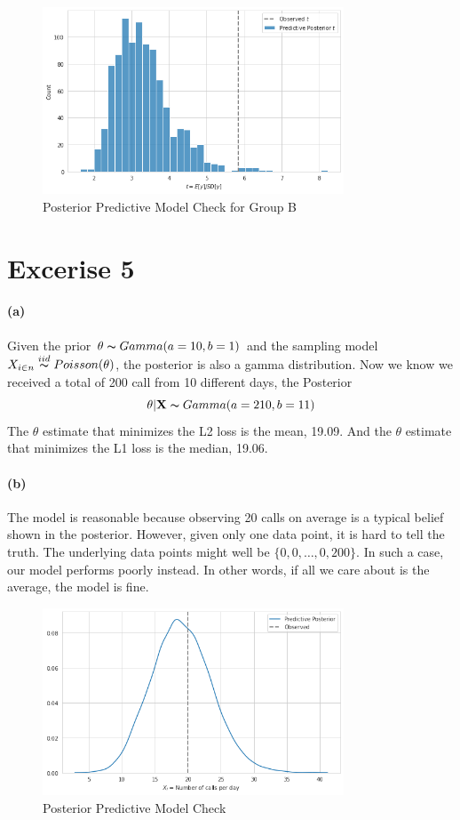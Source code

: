 \documentclass[11pt, letterpaper]{article}
\begin{document}
\begin{figure}[!h]
  \centering
  \includegraphics[width=0.8\textwidth]{4.3.b.png}
  \captionsetup{justification=centering}
  \caption{Posterior Predictive Model Check for Group B}
\end{figure}
\newpage


\section{Excerise 5}
\paragraph{(a)}
Given the prior $\theta \thicksim Gamma(a=10, b=1)$ and the sampling model
$X_{i \in n} \overset{iid}{\thicksim} Poisson(\theta)$, the posterior is also a gamma distribution.
Now we know we received a total of 200 call from 10 different days, the Posterior
\[ \theta|\mathbf{X} \thicksim Gamma(a=210, b=11) \]
The $\theta$ estimate that minimizes the L2 loss is the mean, 19.09. And the $\theta$ estimate
that minimizes the L1 loss is the median, 19.06.

\paragraph{(b)}
The model is reasonable because observing 20 calls on average is a typical belief shown in the posterior.
However, given only one data point, it is hard to tell the truth. The underlying data points might well be
$\{0, 0, \dots, 0, 200\}$. In such a case, our model performs poorly instead. In other words, if all we
care about is the average, the model is fine.

\begin{figure}[!h]
  \centering
  \includegraphics[width=0.8\textwidth]{5.b.png}
  \captionsetup{justification=centering}
  \caption{Posterior Predictive Model Check}
\end{figure}
\newpage
\end{document}
